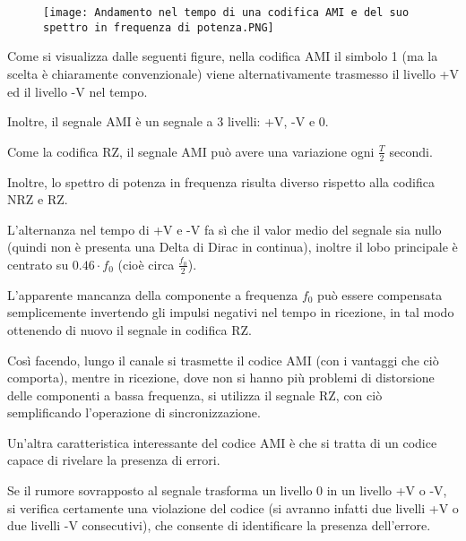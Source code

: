 \begin{figure}[h]
    \centering
    \texttt{[image: Andamento nel tempo di una codifica AMI e del suo spettro in frequenza di potenza.PNG]}
\end{figure} 

Come si visualizza dalle seguenti figure, nella codifica AMI il simbolo 1 (ma la scelta è chiaramente convenzionale) 
viene alternativamente trasmesso il livello +V ed il livello -V nel tempo. \newline 

Inoltre, il segnale AMI è un segnale a 3 livelli: +V, -V e 0. \newline 

Come la codifica RZ, il segnale AMI può avere una variazione ogni $\frac{T}{2}$ secondi. \newline 

Inoltre, lo spettro di potenza in frequenza risulta diverso rispetto alla codifica NRZ e RZ. \newline 

L'alternanza nel tempo di +V e -V fa sì che il valor medio del segnale sia nullo (quindi non è presenta una Delta di Dirac in continua), 
inoltre il lobo principale è centrato su $0.46 \cdot f_0$ (cioè circa $\frac{f_0}{2}$). \newline

L'apparente mancanza della componente a frequenza $f_0$ può essere compensata semplicemente invertendo gli impulsi negativi nel tempo in ricezione, 
in tal modo ottenendo di nuovo il segnale in codifica RZ. \newline 

Così facendo, lungo il canale si trasmette il codice AMI (con i vantaggi che ciò comporta), 
mentre in ricezione, dove non si hanno più problemi di distorsione delle componenti a bassa frequenza, 
si utilizza il segnale RZ, con ciò semplificando l'operazione di sincronizzazione. \newline 

Un'altra caratteristica interessante del codice AMI è che si tratta di un codice capace di rivelare la presenza di errori. \newline 

Se il rumore sovrapposto al segnale trasforma un livello 0 in un livello +V o -V, 
si verifica certamente una violazione del codice (si avranno infatti due livelli +V o due livelli -V consecutivi), 
che consente di identificare la presenza dell'errore. \newline 

